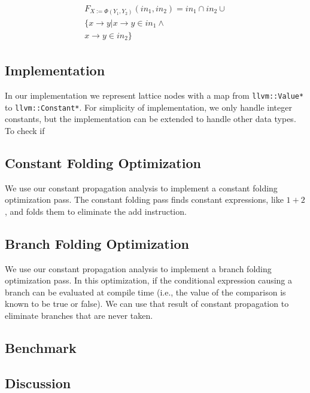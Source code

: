 \begin{align} 
	\begin{split}
		F_{X := \Phi(Y_1, Y_2)}(in_1, in_2) = in_1 \cap in_2  \cup \\
		\{x \to y | x \to y \in in_1 \wedge \\
		 x \to y \in in_2\}
	\end{split}
\end{align}

\subsection{Implementation}

In our implementation we represent lattice nodes with a map from \texttt{llvm::Value*} to \texttt{llvm::Constant*}. For simplicity of implementation, we only handle integer constants, but the implementation can be extended to handle other data types. \\

To check if 

\subsection{Constant Folding Optimization}

We use our constant propagation analysis to implement a constant folding optimization pass. The constant folding pass finds constant expressions, like $1+2$, and folds them to eliminate the add instruction. 

\subsection{Branch Folding Optimization}

We use our constant propagation analysis to implement a branch folding optimization pass. In this optimization, if the conditional expression causing a branch can be evaluated at compile time (i.e., the value of the comparison is known to be true or false). We can use that result of constant propagation to eliminate branches that are never taken. 

\subsection{Benchmark}

\subsection{Discussion}